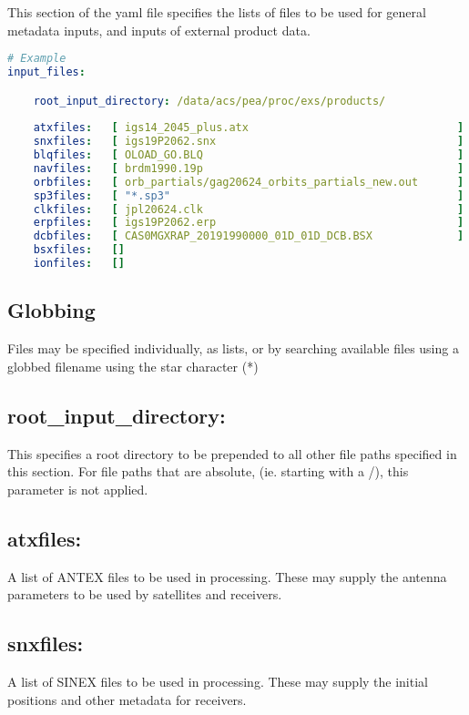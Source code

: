 This section of the yaml file specifies the lists of files to be used for general metadata inputs, and inputs of external product data.

\begin{lstlisting}[language=yaml,caption=A typical input\_files section]
# Example
input_files:

	root_input_directory: /data/acs/pea/proc/exs/products/
	
	atxfiles:   [ igs14_2045_plus.atx                                ]
	snxfiles:   [ igs19P2062.snx                                     ]
	blqfiles:   [ OLOAD_GO.BLQ                                       ]  
	navfiles:   [ brdm1990.19p                                       ]  
	orbfiles:   [ orb_partials/gag20624_orbits_partials_new.out      ]  
	sp3files:   [ "*.sp3"                                            ]
	clkfiles:   [ jpl20624.clk                                       ]  
	erpfiles:   [ igs19P2062.erp                                     ]  
	dcbfiles:   [ CAS0MGXRAP_20191990000_01D_01D_DCB.BSX             ] 
	bsxfiles:   []
	ionfiles:   [] 
\end{lstlisting}

\subsection{Globbing}
Files may be specified individually, as lists, or by searching available files using a globbed filename using the star character (*)

\subsection*{root\_input\_directory:}
This specifies a root directory to be prepended to all other file paths specified in this section. For file paths that are absolute, (ie. starting with a /), this parameter is not applied.

\subsection*{atxfiles:}
A list of ANTEX files to be used in processing. These may supply the antenna parameters to be used by satellites and receivers.

\subsection*{snxfiles:}
A list of SINEX files to be used in processing. These may supply the initial positions and other metadata for receivers.


